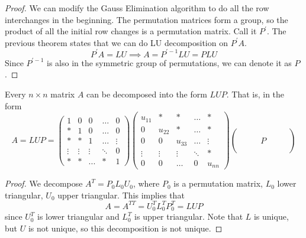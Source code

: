 \documentclass{article}
\begin{document}
    \begin{proof}
    We can modify the Gauss Elimination algorithm to do all the row interchanges in the beginning. The permutation matrices form a group, so the product of all the initial row changes is a permutation matrix. Call it $P^\prime$. The previous theorem states that we can do LU decomposition on $P^\prime A$. 
    \[ P^\prime A = LU \implies A = P^{\prime -1} L U = P L U\]
    Since $P^{\prime -1}$ is also in the symmetric group of permutations, we can denote it as $P$. 
    \end{proof}

    \begin{corollary}
    Every $n \times n$ matrix $A$ can be decomposed into the form $L U P$. That is, in the form
    \[ A = L U P = 
    \begin{pmatrix}
    1 & 0 & 0 & \ldots & 0\\
    * & 1 & 0 & \ldots & 0\\
    * & * & 1 & \ldots & \vdots\\
    \vdots & \vdots & \vdots & \ddots & 0\\
    * & * & ... & * & 1 
    \end{pmatrix}
    \begin{pmatrix}
    u_{11} & * & * & \ldots & *\\
    0 & u_{22} & * & \ldots & *\\
    0 & 0 & u_{33} & \ldots & \vdots\\
    \vdots & \vdots & \vdots & \ddots & * \\
    0 & 0 & \ldots & 0 & u_{n n} 
    \end{pmatrix}
    \begin{pmatrix}
    \\
    \\
     & & & P & & & \\
    \\
     & 
    \end{pmatrix}\]
    \end{corollary}

    \begin{proof}
    We decompose $A^T = P_0 L_0 U_0$, where $P_0$ is a permutation matrix, $L_0$ lower triangular, $U_0$ upper triangular. This implies that 
    \[ A = A^{T T} = U_0^T L_0^T P_0^T = L U P\]
    since $U_0^T$ is lower triangular and $L_0^T$ is upper triangular. Note that $L$ is unique, but $U$ is not unique, so this decomposition is not unique. 
    \end{proof}
\end{document}
